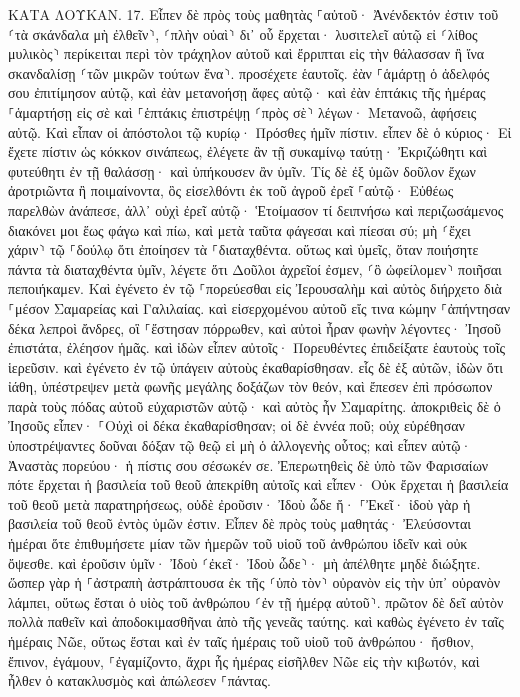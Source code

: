 \documentclass[twoside, 9pt]{extreport}
\begin{document}
ΚΑΤΑ ΛΟΥΚΑΝ.
17.
Εἶπεν δὲ πρὸς τοὺς μαθητὰς ⸀αὐτοῦ· Ἀνένδεκτόν ἐστιν τοῦ ⸂τὰ σκάνδαλα μὴ ἐλθεῖν⸃, ⸂πλὴν οὐαὶ⸃ δι᾽ οὗ ἔρχεται· 
λυσιτελεῖ αὐτῷ εἰ ⸂λίθος μυλικὸς⸃ περίκειται περὶ τὸν τράχηλον αὐτοῦ καὶ ἔρριπται εἰς τὴν θάλασσαν ἢ ἵνα σκανδαλίσῃ ⸂τῶν μικρῶν τούτων ἕνα⸃. 
προσέχετε ἑαυτοῖς. ἐὰν ⸀ἁμάρτῃ ὁ ἀδελφός σου ἐπιτίμησον αὐτῷ, καὶ ἐὰν μετανοήσῃ ἄφες αὐτῷ· 
καὶ ἐὰν ἑπτάκις τῆς ἡμέρας ⸀ἁμαρτήσῃ εἰς σὲ καὶ ⸀ἑπτάκις ἐπιστρέψῃ ⸂πρὸς σὲ⸃ λέγων· Μετανοῶ, ἀφήσεις αὐτῷ. 
Καὶ εἶπαν οἱ ἀπόστολοι τῷ κυρίῳ· Πρόσθες ἡμῖν πίστιν. 
εἶπεν δὲ ὁ κύριος· Εἰ ἔχετε πίστιν ὡς κόκκον σινάπεως, ἐλέγετε ἂν τῇ συκαμίνῳ ταύτῃ· Ἐκριζώθητι καὶ φυτεύθητι ἐν τῇ θαλάσσῃ· καὶ ὑπήκουσεν ἂν ὑμῖν. 
Τίς δὲ ἐξ ὑμῶν δοῦλον ἔχων ἀροτριῶντα ἢ ποιμαίνοντα, ὃς εἰσελθόντι ἐκ τοῦ ἀγροῦ ἐρεῖ ⸀αὐτῷ· Εὐθέως παρελθὼν ἀνάπεσε, 
ἀλλ᾽ οὐχὶ ἐρεῖ αὐτῷ· Ἑτοίμασον τί δειπνήσω καὶ περιζωσάμενος διακόνει μοι ἕως φάγω καὶ πίω, καὶ μετὰ ταῦτα φάγεσαι καὶ πίεσαι σύ; 
μὴ ⸂ἔχει χάριν⸃ τῷ ⸀δούλῳ ὅτι ἐποίησεν τὰ ⸀διαταχθέντα. 
οὕτως καὶ ὑμεῖς, ὅταν ποιήσητε πάντα τὰ διαταχθέντα ὑμῖν, λέγετε ὅτι Δοῦλοι ἀχρεῖοί ἐσμεν, ⸂ὃ ὠφείλομεν⸃ ποιῆσαι πεποιήκαμεν. 
Καὶ ἐγένετο ἐν τῷ ⸀πορεύεσθαι εἰς Ἰερουσαλὴμ καὶ αὐτὸς διήρχετο διὰ ⸀μέσον Σαμαρείας καὶ Γαλιλαίας. 
καὶ εἰσερχομένου αὐτοῦ εἴς τινα κώμην ⸀ἀπήντησαν δέκα λεπροὶ ἄνδρες, οἳ ⸀ἔστησαν πόρρωθεν, 
καὶ αὐτοὶ ἦραν φωνὴν λέγοντες· Ἰησοῦ ἐπιστάτα, ἐλέησον ἡμᾶς. 
καὶ ἰδὼν εἶπεν αὐτοῖς· Πορευθέντες ἐπιδείξατε ἑαυτοὺς τοῖς ἱερεῦσιν. καὶ ἐγένετο ἐν τῷ ὑπάγειν αὐτοὺς ἐκαθαρίσθησαν. 
εἷς δὲ ἐξ αὐτῶν, ἰδὼν ὅτι ἰάθη, ὑπέστρεψεν μετὰ φωνῆς μεγάλης δοξάζων τὸν θεόν, 
καὶ ἔπεσεν ἐπὶ πρόσωπον παρὰ τοὺς πόδας αὐτοῦ εὐχαριστῶν αὐτῷ· καὶ αὐτὸς ἦν Σαμαρίτης. 
ἀποκριθεὶς δὲ ὁ Ἰησοῦς εἶπεν· ⸀Οὐχὶ οἱ δέκα ἐκαθαρίσθησαν; οἱ δὲ ἐννέα ποῦ; 
οὐχ εὑρέθησαν ὑποστρέψαντες δοῦναι δόξαν τῷ θεῷ εἰ μὴ ὁ ἀλλογενὴς οὗτος; 
καὶ εἶπεν αὐτῷ· Ἀναστὰς πορεύου· ἡ πίστις σου σέσωκέν σε. 
Ἐπερωτηθεὶς δὲ ὑπὸ τῶν Φαρισαίων πότε ἔρχεται ἡ βασιλεία τοῦ θεοῦ ἀπεκρίθη αὐτοῖς καὶ εἶπεν· Οὐκ ἔρχεται ἡ βασιλεία τοῦ θεοῦ μετὰ παρατηρήσεως, 
οὐδὲ ἐροῦσιν· Ἰδοὺ ὧδε ἤ· ⸀Ἐκεῖ· ἰδοὺ γὰρ ἡ βασιλεία τοῦ θεοῦ ἐντὸς ὑμῶν ἐστιν. 
Εἶπεν δὲ πρὸς τοὺς μαθητάς· Ἐλεύσονται ἡμέραι ὅτε ἐπιθυμήσετε μίαν τῶν ἡμερῶν τοῦ υἱοῦ τοῦ ἀνθρώπου ἰδεῖν καὶ οὐκ ὄψεσθε. 
καὶ ἐροῦσιν ὑμῖν· Ἰδοὺ ⸂ἐκεῖ· Ἰδοὺ ὧδε⸃· μὴ ἀπέλθητε μηδὲ διώξητε. 
ὥσπερ γὰρ ἡ ⸀ἀστραπὴ ἀστράπτουσα ἐκ τῆς ⸂ὑπὸ τὸν⸃ οὐρανὸν εἰς τὴν ὑπ᾽ οὐρανὸν λάμπει, οὕτως ἔσται ὁ υἱὸς τοῦ ἀνθρώπου ⸂ἐν τῇ ἡμέρᾳ αὐτοῦ⸃. 
πρῶτον δὲ δεῖ αὐτὸν πολλὰ παθεῖν καὶ ἀποδοκιμασθῆναι ἀπὸ τῆς γενεᾶς ταύτης. 
καὶ καθὼς ἐγένετο ἐν ταῖς ἡμέραις Νῶε, οὕτως ἔσται καὶ ἐν ταῖς ἡμέραις τοῦ υἱοῦ τοῦ ἀνθρώπου· 
ἤσθιον, ἔπινον, ἐγάμουν, ⸀ἐγαμίζοντο, ἄχρι ἧς ἡμέρας εἰσῆλθεν Νῶε εἰς τὴν κιβωτόν, καὶ ἦλθεν ὁ κατακλυσμὸς καὶ ἀπώλεσεν ⸀πάντας. 
\end{document}
